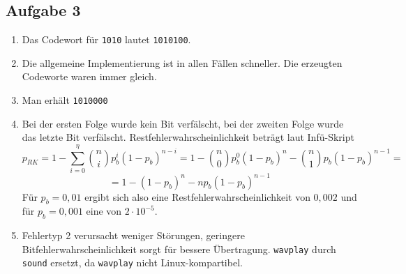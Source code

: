 \documentclass[a4paper,10pt]{scrartcl}
\begin{document}
\subsection*{Aufgabe 3}
\begin{enumerate}
 \item Das Codewort für \texttt{1010} lautet \texttt{1010100}.
 \item Die allgemeine Implementierung ist in allen Fällen schneller. Die erzeugten Codeworte waren immer gleich.
 \item Man erhält \texttt{1010000}
 \item Bei der ersten Folge wurde kein Bit verfälscht, bei der zweiten Folge wurde das letzte Bit verfälscht. Restfehlerwahrscheinlichkeit beträgt laut Infü-Skript
	\[ p_{RK} = 1 - \sum_{i=0}^\eta { n \choose i } p_b^i(1-p_b)^{n-i} = 1 - { n \choose 0 } p_b^0(1-p_b)^n - { n \choose 1 } p_b (1-p_b)^{n-1} = \]
	\[ = 1 - (1 - p_b)^n - n p_b (1-p_b)^{n-1} \]
	Für \(p_b = 0,01\) ergibt sich also eine Restfehlerwahrscheinlichkeit von \(0,002\) und für \(p_b = 0,001\) eine von \(2 \cdot 10^{-5}\).
 \item Fehlertyp 2 verursacht weniger Störungen, geringere Bitfehlerwahrscheinlichkeit sorgt für bessere Übertragung. \texttt{wavplay} durch \texttt{sound} ersetzt, da \texttt{wavplay} nicht Linux-kompartibel.
\end{enumerate}
\end{document}
